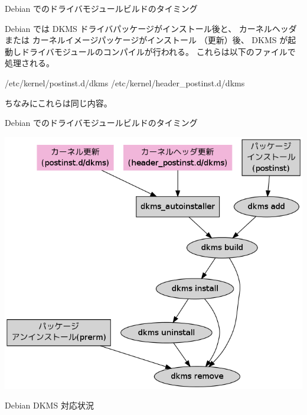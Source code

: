 \begin{frame}[containsverbatim]{Debian でのドライバモジュールビルドのタイミング}

Debian では DKMS ドライバパッケージがインストール後と、
カーネルヘッダ または カーネルイメージパッケージがインストール
（更新）後、 DKMS が起動しドライバモジュールのコンパイルが行われる。
これらは以下のファイルで処理される。

\begin{commandline}
/etc/kernel/postinst.d/dkms
/etc/kernel/header_postinst.d/dkms
\end{commandline}

ちなみにこれらは同じ内容。

\end{frame}

\begin{frame}[containsverbatim]{Debian でのドライバモジュールビルドのタイミング}

\begin{center}
  \includegraphics[width=0.8\hsize]{image201202/dkms-debian-kernel.png}
\end{center}

\end{frame}


\begin{frame}
\large\bfseries
\begin{center}
Debian DKMS 対応状況
\end{center}
\end{frame}


